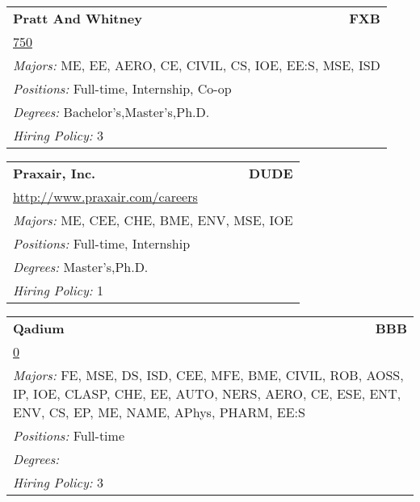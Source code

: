 \documentclass[twoside]{article}
\begin{document}
\begin{center}
\begin{multicols}{3}
\begin{FlushLeft}
\begin{minipage}{.9\columnwidth}\begin{tabularx}{.95\columnwidth}{Xr}
                 {\Large\bf Pratt And Whitney} & {\Large\bf FXB}\\
    \multicolumn{2}{p{.95\columnwidth}}{\url{750}}\\
    \multicolumn{2}{p{.95\columnwidth}}{\emph{Majors:} ME, EE, AERO, CE, CIVIL, CS, IOE, EE:S, MSE, ISD}\\
    \multicolumn{2}{p{.95\columnwidth}}{\emph{Positions:} Full-time, Internship, Co-op}\\
    \multicolumn{2}{p{.95\columnwidth}}{\emph{Degrees:} Bachelor's,Master's,Ph.D.}\\
    \multicolumn{2}{p{.95\columnwidth}}{\emph{Hiring Policy:} 3}\\
    \end{tabularx}
    
\end{minipage}
 
\begin{minipage}{.9\columnwidth}\begin{tabularx}{.95\columnwidth}{Xr}
                 {\Large\bf Praxair, Inc.} & {\Large\bf DUDE}\\
    \multicolumn{2}{p{.95\columnwidth}}{\url{http://www.praxair.com/careers}}\\
    \multicolumn{2}{p{.95\columnwidth}}{\emph{Majors:} ME, CEE, CHE, BME, ENV, MSE, IOE}\\
    \multicolumn{2}{p{.95\columnwidth}}{\emph{Positions:} Full-time, Internship}\\
    \multicolumn{2}{p{.95\columnwidth}}{\emph{Degrees:} Master's,Ph.D.}\\
    \multicolumn{2}{p{.95\columnwidth}}{\emph{Hiring Policy:} 1}\\
    \end{tabularx}
    
\end{minipage}
 
\begin{minipage}{.9\columnwidth}\begin{tabularx}{.95\columnwidth}{Xr}
                 {\Large\bf Qadium} & {\Large\bf BBB}\\
    \multicolumn{2}{p{.95\columnwidth}}{\url{0}}\\
    \multicolumn{2}{p{.95\columnwidth}}{\emph{Majors:} FE, MSE, DS, ISD, CEE, MFE, BME, CIVIL, ROB, AOSS, IP, IOE, CLASP, CHE, EE, AUTO, NERS, AERO, CE, ESE, ENT, ENV, CS, EP, ME, NAME, APhys, PHARM, EE:S}\\
    \multicolumn{2}{p{.95\columnwidth}}{\emph{Positions:} Full-time}\\
    \multicolumn{2}{p{.95\columnwidth}}{\emph{Degrees:} }\\
    \multicolumn{2}{p{.95\columnwidth}}{\emph{Hiring Policy:} 3}\\
    \end{tabularx}
    

\end{minipage}
\end{FlushLeft}
\end{multicols}
\end{center}
\end{document}
